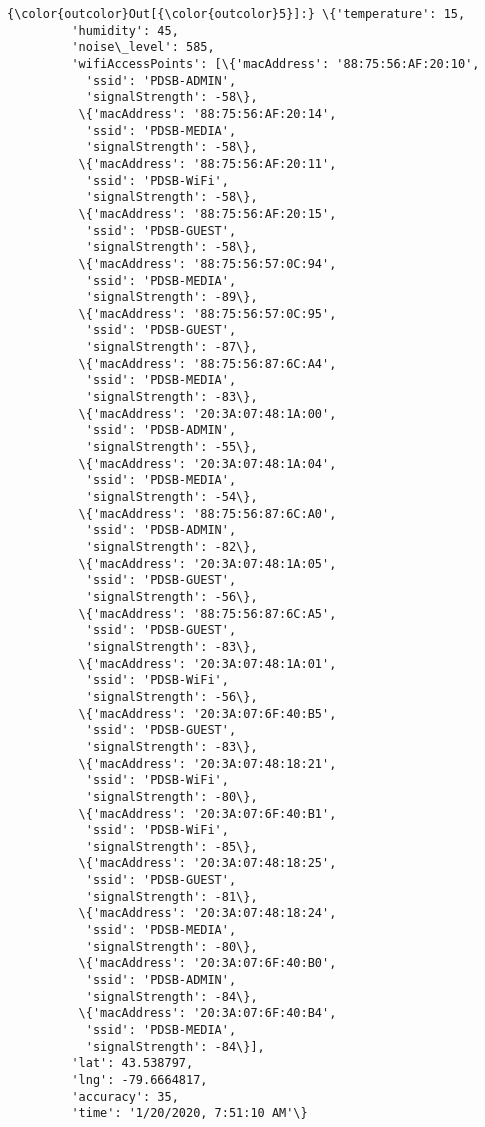 \documentclass[11pt]{article}
\begin{document}
\begin{Verbatim}[commandchars=\\\{\}]
{\color{outcolor}Out[{\color{outcolor}5}]:} \{'temperature': 15,
         'humidity': 45,
         'noise\_level': 585,
         'wifiAccessPoints': [\{'macAddress': '88:75:56:AF:20:10',
           'ssid': 'PDSB-ADMIN',
           'signalStrength': -58\},
          \{'macAddress': '88:75:56:AF:20:14',
           'ssid': 'PDSB-MEDIA',
           'signalStrength': -58\},
          \{'macAddress': '88:75:56:AF:20:11',
           'ssid': 'PDSB-WiFi',
           'signalStrength': -58\},
          \{'macAddress': '88:75:56:AF:20:15',
           'ssid': 'PDSB-GUEST',
           'signalStrength': -58\},
          \{'macAddress': '88:75:56:57:0C:94',
           'ssid': 'PDSB-MEDIA',
           'signalStrength': -89\},
          \{'macAddress': '88:75:56:57:0C:95',
           'ssid': 'PDSB-GUEST',
           'signalStrength': -87\},
          \{'macAddress': '88:75:56:87:6C:A4',
           'ssid': 'PDSB-MEDIA',
           'signalStrength': -83\},
          \{'macAddress': '20:3A:07:48:1A:00',
           'ssid': 'PDSB-ADMIN',
           'signalStrength': -55\},
          \{'macAddress': '20:3A:07:48:1A:04',
           'ssid': 'PDSB-MEDIA',
           'signalStrength': -54\},
          \{'macAddress': '88:75:56:87:6C:A0',
           'ssid': 'PDSB-ADMIN',
           'signalStrength': -82\},
          \{'macAddress': '20:3A:07:48:1A:05',
           'ssid': 'PDSB-GUEST',
           'signalStrength': -56\},
          \{'macAddress': '88:75:56:87:6C:A5',
           'ssid': 'PDSB-GUEST',
           'signalStrength': -83\},
          \{'macAddress': '20:3A:07:48:1A:01',
           'ssid': 'PDSB-WiFi',
           'signalStrength': -56\},
          \{'macAddress': '20:3A:07:6F:40:B5',
           'ssid': 'PDSB-GUEST',
           'signalStrength': -83\},
          \{'macAddress': '20:3A:07:48:18:21',
           'ssid': 'PDSB-WiFi',
           'signalStrength': -80\},
          \{'macAddress': '20:3A:07:6F:40:B1',
           'ssid': 'PDSB-WiFi',
           'signalStrength': -85\},
          \{'macAddress': '20:3A:07:48:18:25',
           'ssid': 'PDSB-GUEST',
           'signalStrength': -81\},
          \{'macAddress': '20:3A:07:48:18:24',
           'ssid': 'PDSB-MEDIA',
           'signalStrength': -80\},
          \{'macAddress': '20:3A:07:6F:40:B0',
           'ssid': 'PDSB-ADMIN',
           'signalStrength': -84\},
          \{'macAddress': '20:3A:07:6F:40:B4',
           'ssid': 'PDSB-MEDIA',
           'signalStrength': -84\}],
         'lat': 43.538797,
         'lng': -79.6664817,
         'accuracy': 35,
         'time': '1/20/2020, 7:51:10 AM'\}
\end{Verbatim}
            
\end{document}
